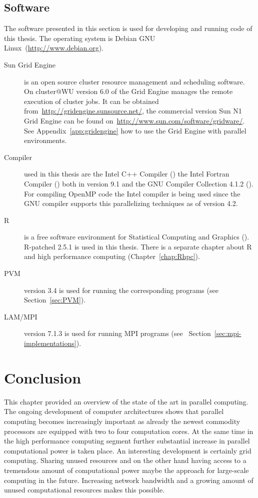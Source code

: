 \begin{description}
\begin{description}
\subsection{Software}

The software presented in this section is used for developing and
running code of this thesis. The operating system is Debian GNU
Linux~(\url{http://www.debian.org}).
 
\begin{description}
\item[Sun Grid Engine] is an open source cluster resource management
  and scheduling software. On cluster@WU version 6.0 of the Grid
  Engine manages the remote execution of cluster jobs. It can be obtained
  from~\url{http://gridengine.sunsource.net/}, the commercial version
  Sun N1 Grid Engine can be found
  on~\url{http://www.sun.com/software/gridware/}. See
  Appendix~\ref{app:gridengine} how to use the Grid Engine with
  parallel environments.
\item[Compiler] used in this thesis are the Intel C++ Compiler
  (\cite{icc07}) the Intel Fortran Compiler (\cite{ifort07}) both in
  version 9.1 
  and the GNU Compiler Collection 4.1.2 (\cite{gcc07}). For compiling
  OpenMP code the 
  Intel compiler is being used since the GNU compiler supports this
  parallelizing techniques as of version 4.2.
\item[R] is a free software environment for Statistical Computing and
  Graphics (\cite{Rcore07R}). R-patched 2.5.1 is used in this
  thesis. There is a separate
  chapter about R and high performance computing (Chapter~\ref{chap:Rhpc}).
\item[PVM] version 3.4 is used for running the corresponding programs
  (see Section~\ref{sec:PVM}).
\item[LAM/MPI] version 7.1.3 is used for running MPI programs (see~
  Section~\ref{sec:mpi-implementations}). 
\end{description}

\section{Conclusion}

This chapter provided an overview of the state of the art in parallel
computing. The ongoing development of computer architectures shows that
parallel computing becomes increasingly important as already the newest
commodity processors are equipped with two to four computation
cores. At the same time in the high performance computing segment
further substantial increase in parallel computational power is taken
place. An interesting development is certainly grid computing. Sharing
unused resources and on the other hand having access to a tremendous
amount of computational power maybe the approach for large-scale
computing in the future. Increasing network bandwidth and a growing
amount of unused computational resources makes this possible.



\end{description}
\end{description}
